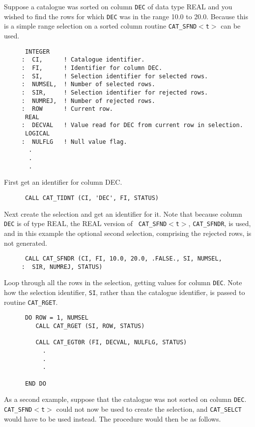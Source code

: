 Suppose a catalogue was sorted on column {\tt DEC} of data type REAL 
and you wished to find the rows for which {\tt DEC} was in the range 
10.0 to 20.0. Because this is a simple range selection on a sorted
column routine {\tt CAT\_SFND$<$t$>$} can be used.

\begin{verbatim}
      INTEGER
     :  CI,      ! Catalogue identifier.
     :  FI,      ! Identifier for column DEC.
     :  SI,      ! Selection identifier for selected rows.
     :  NUMSEL,  ! Number of selected rows.
     :  SIR,     ! Selection identifier for rejected rows.
     :  NUMREJ,  ! Number of rejected rows.
     :  ROW      ! Current row.
      REAL
     :  DECVAL   ! Value read for DEC from current row in selection.
      LOGICAL
     :  NULFLG   ! Null value flag.
       .
       .
       .
\end{verbatim}

First get an identifier for column DEC.

\begin{verbatim}
      CALL CAT_TIDNT (CI, 'DEC', FI, STATUS)
\end{verbatim}

Next create the selection and get an identifier for it. Note that
because column {\tt DEC} is of type REAL, the REAL version of {\tt 
CAT\_SFND$<$t$>$}, {\tt CAT\_SFNDR}, is used, and in this example the
optional second selection, comprising the rejected rows, is not 
generated.

\begin{verbatim}
      CALL CAT_SFNDR (CI, FI, 10.0, 20.0, .FALSE., SI, NUMSEL,
     :  SIR, NUMREJ, STATUS)
\end{verbatim}

Loop through all the rows in the selection, getting values for
column {\tt DEC}.  Note how the selection identifier, {\tt SI}, rather
than the catalogue identifier, is passed to routine {\tt CAT\_RGET}.


\begin{verbatim}
      DO ROW = 1, NUMSEL
         CALL CAT_RGET (SI, ROW, STATUS)

         CALL CAT_EGT0R (FI, DECVAL, NULFLG, STATUS)
           .
           .
           .

      END DO
\end{verbatim}

As a second example, suppose that the catalogue was not sorted on column
{\tt DEC}. {\tt CAT\_SFND$<$t$>$} could not now be used to create the 
selection, and {\tt CAT\_SELCT} would have to be used instead. The 
procedure would then be as follows.

